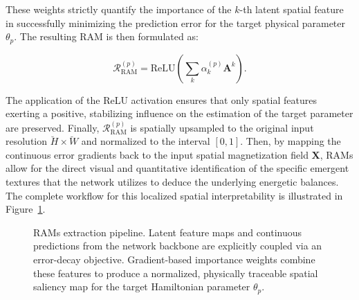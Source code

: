 \documentclass[final,5p,times,twocolumn]{elsarticle}
\begin{document}
These weights strictly quantify the importance of the $k$-th latent spatial feature in successfully minimizing the prediction error for the target physical parameter $\theta_p$. The resulting RAM is then formulated as:

\begin{equation}\label{eq:RAM_Formulation}
\mathbf{\mathcal{R}}_{\text{RAM}}^{(p)} = \text{ReLU} \left( \sum_k \alpha_k^{(p)} \mathbf{A}^k \right).
\end{equation}

The application of the ReLU activation ensures that only spatial features exerting a positive, stabilizing influence on the estimation of the target parameter are preserved. Finally, $\mathcal{R}_{\text{RAM}}^{(p)}$ is spatially upsampled to the original input resolution $\breve{H} \times \breve{W}$ and normalized to the interval $[0,1]$. Then, by mapping the continuous error gradients back to the input spatial magnetization field $\mathbf{X}$, RAMs allow for the direct visual and quantitative identification of the specific emergent textures that the network utilizes to deduce the underlying energetic balances. The complete workflow for this localized spatial interpretability is illustrated in Figure~\ref{fig:rams_pipeline}.


\begin{figure}[t!]
  \centering
  \vspace{0.3cm}
  \resizebox{0.7\linewidth}{!}{
  
  }
  \caption{RAMs extraction pipeline. Latent feature maps and continuous predictions from the network backbone are explicitly coupled via an error-decay objective. Gradient-based importance weights combine these features to produce a normalized, physically traceable spatial saliency map for the target Hamiltonian parameter $\theta_{p}$.}
  \label{fig:rams_pipeline}
\end{figure}
\end{document}
